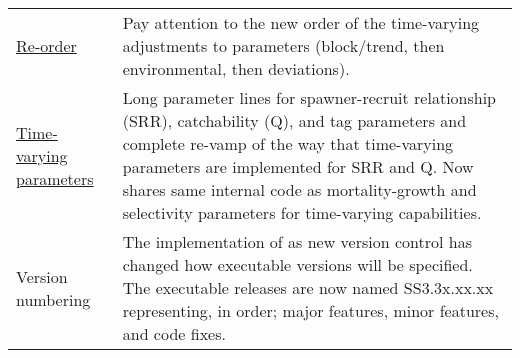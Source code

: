 \begin{center}
{\begin{longtable}{p{1.75cm} p{9.5cm}}
		\multicolumn{1}{l}{\hyperlink{tvOrder}{Re-order}} & 
				Pay attention to the new order of the time-varying adjustments to parameters (block/trend, then environmental, then deviations). \\
			
		\multicolumn{1}{l}{\hyperlink{time-vary}{Time-varying parameters}} & 
				Long parameter lines for spawner-recruit relationship (SRR), catchability (Q), and tag parameters and complete re-vamp of the way that time-varying parameters are implemented for SRR and Q.  Now shares same internal code as mortality-growth and selectivity parameters for time-varying capabilities.\\

		\multicolumn{1}{l}{Version numbering}	& The implementation of as new version control has changed how executable versions will be specified. The executable releases are now named SS3.3x.xx.xx representing, in order; major features, minor features, and code fixes. \\
		 \hline
	\end{longtable}}
\end{center}


